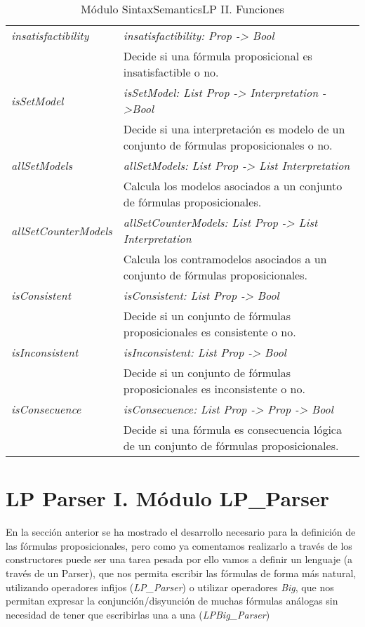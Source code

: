 \documentclass[a4paper]{report}
\begin{document}
\begin{table}[H]
\begin{tabular}{p{3cm} p{13.2cm}}
\hline
\textit{insatisfactibility}& \textit{insatisfactibility: Prop -> Bool}\\
& Decide si una fórmula proposicional es insatisfactible o no.\\
\hline
\textit{isSetModel}& \textit{isSetModel: List Prop -> Interpretation ->Bool}\\
& Decide si una interpretación es modelo de un conjunto de fórmulas proposicionales o no.\\
\hline
\textit{allSetModels}& \textit{allSetModels: List Prop -> List Interpretation}\\
& Calcula los modelos asociados a un conjunto de fórmulas proposicionales.\\
\hline
\textit{allSetCounterModels}& \textit{allSetCounterModels: List Prop -> List Interpretation}\\
& Calcula los contramodelos asociados a un conjunto de fórmulas proposicionales.\\
\hline
\textit{isConsistent}& \textit{isConsistent: List Prop -> Bool}\\
& Decide si un conjunto de fórmulas proposicionales es consistente o no.\\
\hline
\textit{isInconsistent}& \textit{isInconsistent: List Prop -> Bool}\\
& Decide si un conjunto de fórmulas proposicionales es inconsistente o no.\\
\hline
\textit{isConsecuence}& \textit{isConsecuence: List Prop -> Prop -> Bool}\\
& Decide si una fórmula es consecuencia lógica de un conjunto de fórmulas proposicionales.\\
\hline
\end{tabular}
\caption{Módulo SintaxSemanticsLP II. Funciones}
\end{table}

\newpage

\section{LP Parser I. Módulo LP\_Parser}

En la sección anterior se ha mostrado el desarrollo necesario para la definición de las fórmulas proposicionales, pero como ya comentamos realizarlo a través de los constructores puede ser una tarea pesada por ello vamos a definir un lenguaje (a través de un Parser), que nos permita escribir las fórmulas de forma más natural, utilizando operadores infijos (\textit{LP\_Parser}) o utilizar operadores \textit{Big}, que nos permitan expresar la conjunción/disyunción de muchas fórmulas análogas sin necesidad de tener que escribirlas una a una (\textit{LPBig\_Parser})
\end{document}

